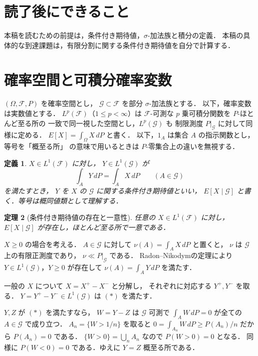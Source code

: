 \documentclass[a5paper,10pt,onecolumn]{jsarticle}
\makeatletter
\theoremstyle{mathnotetheorem}
\newtheorem{theorem}{定理}[section]
\newtheorem{definition}[theorem]{定義}
\renewcommand{\proofname}{証明}
\renewenvironment{proof}[1][\proofname]{%
  \par\pushQED{\qed}\normalfont\topsep4\p@\@plus2\p@\relax
  \trivlist\item[\hskip\labelsep\bfseries #1]\ignorespaces
}{\popQED\endtrivlist\@endpefalse}
\makeatother
\begin{document}
\section*{読了後にできること}
本稿を読むための前提は，条件付き期待値，$\sigma$-加法族と積分の定義．
本稿の具体的な到達課題は，有限分割に関する条件付き期待値を自分で計算する．

\section{確率空間と可積分確率変数}

$(\Omega,\mathcal F,P)$ を確率空間とし，
$\mathcal G\subset\mathcal F$ を部分 $\sigma$-加法族とする．
以下，確率変数は実数値とする．
$L^p(\mathcal F)$（$1\le p<\infty$）は
$\mathcal F$-可測な $p$ 乗可積分関数を $P$-ほとんど至る所の
一致で同一視した空間とし，$L^p(\mathcal G)$ も
制限測度 $P|_{\mathcal G}$ に対して同様に定める．
$E[X]=\int_\Omega X\,dP$ と書く．
以下，$1_A$ は集合 $A$ の指示関数とし，等号を「概至る所」
の意味で用いるときは $P$-零集合上の違いを無視する．

\begin{definition}
$X\in L^1(\mathcal F)$ に対し，
$Y\in L^1(\mathcal G)$ が
\[
 \int_A Y\,dP=\int_A X\,dP\qquad(A\in\mathcal G)
 \tag{$*$}
\]
を満たすとき，
$Y$ を $X$ の $\mathcal G$ に関する\emph{条件付き期待値}といい，
$E[X\mid\mathcal G]$ と書く．等号は概同値類として理解する．
\end{definition}

\begin{theorem}[条件付き期待値の存在と一意性]\label{thm:ce}
任意の $X\in L^1(\mathcal F)$ に対し，
$E[X\mid\mathcal G]$ が存在し，ほとんど至る所で一意である．
\end{theorem}
\begin{proof}
$X\ge0$ の場合を考える．
$A\in\mathcal G$ に対して
$\nu(A)=\int_A X\,dP$ と置くと，
$\nu$ は $\mathcal G$ 上の有限正測度であり，
$\nu\ll P|_{\mathcal G}$ である．
Radon--Nikodymの定理により
$Y\in L^1(\mathcal G)$，$Y\ge0$ が存在して
$\nu(A)=\int_A Y\,dP$ を満たす．

一般の $X$ について $X=X^+-X^-$ と分解し，
それぞれに対応する $Y^+,Y^-$ を取る．
$Y=Y^+-Y^-\in L^1(\mathcal G)$ は $(*)$ を満たす．

$Y,Z$ が $(*)$ を満たすなら，
$W=Y-Z$ は $\mathcal G$ 可測で
$\int_AW\,dP=0$ が全ての $A\in\mathcal G$ で成り立つ．
$A_n=\{W>1/n\}$ を取ると
$0=\int_{A_n}W\,dP\ge P(A_n)/n$ だから $P(A_n)=0$ である．
$\{W>0\}=\bigcup_nA_n$ なので $P(W>0)=0$ となる．
同様に $P(W<0)=0$ である．ゆえに $Y=Z$ 概至る所である．
\end{proof}
\end{document}
